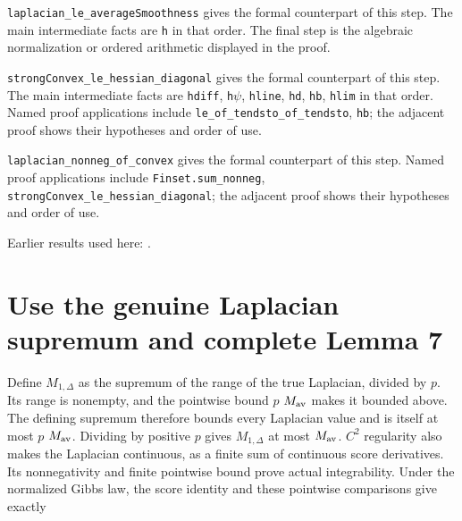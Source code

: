\documentclass[11pt,a4paper]{article}
\begin{document}
\begin{leanbox}
\texttt{laplacian\_\allowbreak{}le\_\allowbreak{}average\allowbreak{}Smoothness} gives the formal counterpart of this step. The main intermediate facts are \texttt{h} in that order. The final step is the algebraic normalization or ordered arithmetic displayed in the proof.




\texttt{strong\allowbreak{}Convex\_\allowbreak{}le\_\allowbreak{}hessian\_\allowbreak{}diagonal} gives the formal counterpart of this step. The main intermediate facts are \texttt{hdiff}, \texttt{h\ensuremath{\psi}}, \texttt{hline}, \texttt{hd}, \texttt{hb}, \texttt{hlim} in that order. Named proof applications include \texttt{le\_\allowbreak{}of\_\allowbreak{}tendsto\_\allowbreak{}of\_\allowbreak{}tendsto}, \texttt{hb}; the adjacent proof shows their hypotheses and order of use.




\texttt{laplacian\_\allowbreak{}nonneg\_\allowbreak{}of\_\allowbreak{}convex} gives the formal counterpart of this step. Named proof applications include \texttt{Finset.\allowbreak{}sum\_\allowbreak{}nonneg}, \texttt{strong\allowbreak{}Convex\_\allowbreak{}le\_\allowbreak{}hessian\_\allowbreak{}diagonal}; the adjacent proof shows their hypotheses and order of use.
\end{leanbox}


Earlier results used here: \cite[Section~3.2.3]{LangevinLean2026ULASC}.

\section{\texorpdfstring{Use the genuine Laplacian supremum and complete Lemma 7}{Use the genuine Laplacian supremum and complete Lemma 7}}


Define \(M_{1,\Delta}\) as the supremum of the range of the true Laplacian, divided by \(p\). Its range is nonempty, and the pointwise bound \(p\) \(M_{\rm av}\) makes it bounded above. The defining supremum therefore bounds every Laplacian value and is itself at most \(p\) \(M_{\rm av}\). Dividing by positive \(p\) gives \(M_{1,\Delta}\) at most \(M_{\rm av}\). \(C^{2}\) regularity also makes the Laplacian continuous, as a finite sum of continuous score derivatives. Its nonnegativity and finite pointwise bound prove actual integrability. Under the normalized Gibbs law, the score identity and these pointwise comparisons give exactly
\end{document}
